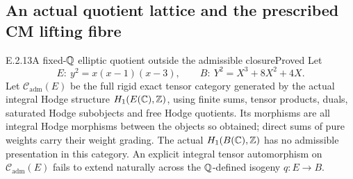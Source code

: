 \subsection{An actual quotient lattice and the prescribed CM lifting fibre}

\begin{result}{E.2.13}{A fixed-\(\mathbb Q\) elliptic quotient outside the admissible closure}{Proved}
Let
\[
 E:\ y^2=x(x-1)(x-3),\qquad
 B:\ Y^2=X^3+8X^2+4X .
\]
Let \(\mathcal C_{\mathrm{adm}}(E)\) be the full rigid exact tensor
category generated by the actual integral Hodge structure
\(H_1(E(\mathbb C),\mathbb Z)\), using finite sums, tensor products, duals,
saturated Hodge subobjects and free Hodge quotients. Its morphisms
are all integral Hodge morphisms between the objects so obtained;
direct sums of pure weights carry their weight grading.
The actual \(H_1(B(\mathbb C),\mathbb Z)\) has no admissible presentation in this
category. An explicit integral tensor automorphism on
\(\mathcal C_{\mathrm{adm}}(E)\) fails to extend naturally across
the \(\mathbb Q\)-defined isogeny \(q:E\to B\).
\end{result}
